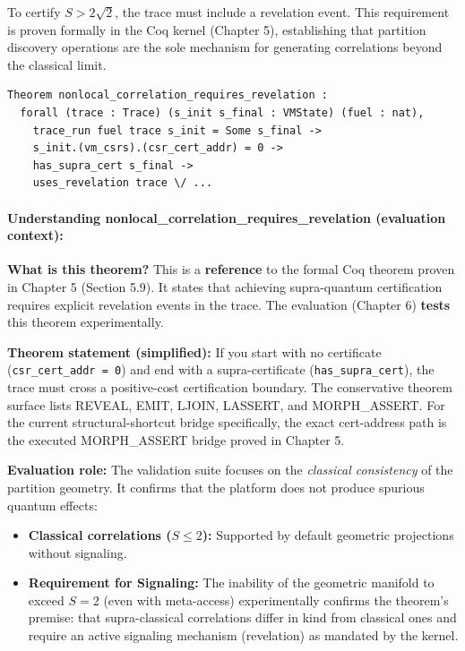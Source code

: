 To certify $S > 2\sqrt{2}$, the trace must include a revelation event. This requirement is proven formally in the Coq kernel (Chapter 5), establishing that partition discovery operations are the sole mechanism for generating correlations beyond the classical limit.

\begin{lstlisting}
Theorem nonlocal_correlation_requires_revelation :
  forall (trace : Trace) (s_init s_final : VMState) (fuel : nat),
    trace_run fuel trace s_init = Some s_final ->
    s_init.(vm_csrs).(csr_cert_addr) = 0 ->
    has_supra_cert s_final ->
    uses_revelation trace \/ ...
\end{lstlisting}

\paragraph{Understanding nonlocal\_correlation\_requires\_revelation (evaluation context):}

\textbf{What is this theorem?} This is a \textbf{reference} to the formal Coq theorem proven in Chapter 5 (Section 5.9). It states that achieving supra-quantum certification requires explicit revelation events in the trace. The evaluation (Chapter 6) \textbf{tests} this theorem experimentally.

\textbf{Theorem statement (simplified):} If you start with no certificate (\texttt{csr\_cert\_addr = 0}) and end with a supra-certificate (\texttt{has\_supra\_cert}), the trace must cross a positive-cost certification boundary. The conservative theorem surface lists REVEAL, EMIT, LJOIN, LASSERT, and MORPH\_ASSERT. For the current structural-shortcut bridge specifically, the exact cert-address path is the executed MORPH\_ASSERT bridge proved in Chapter 5.

\textbf{Evaluation role:} The validation suite focuses on the \textit{classical consistency} of the partition geometry. It confirms that the platform does not produce spurious quantum effects:
\begin{itemize}
    \item \textbf{Classical correlations ($S \leq 2$):} Supported by default geometric projections without signaling.
    \item \textbf{Requirement for Signaling:} The inability of the geometric manifold to exceed $S=2$ (even with meta-access) experimentally confirms the theorem's premise: that supra-classical correlations differ in kind from classical ones and require an active signaling mechanism (revelation) as mandated by the kernel.
\end{itemize}

